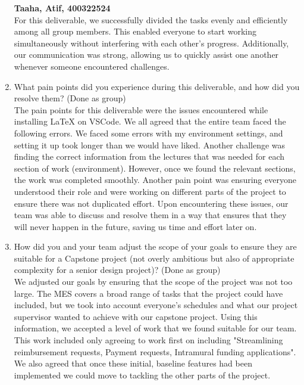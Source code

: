 \documentclass{article}
\begin{document}
\begin{enumerate}
    \textbf{Taaha, Atif, 400322524} \\
    For this deliverable, we successfully divided the tasks evenly and efficiently among all group members. This enabled everyone to start working simultaneously without interfering with each other's progress. Additionally, our communication was strong, allowing us to quickly assist one another whenever someone encountered challenges.
    \item What pain points did you experience during this deliverable, and how
    did you resolve them? (Done as group) \\
    The pain points for this deliverable were the issues encountered while installing LaTeX on VSCode. We all agreed that the entire team faced the following errors. We faced some errors with my environment settings, and setting it up took longer than we would have liked. Another challenge was finding the correct information from the lectures that was needed for each section of work (environment). However, once we found the relevant sections, the work was completed smoothly. Another pain point was ensuring everyone understood their role and were working on different parts of the project to ensure there was not duplicated effort. Upon encountering these issues, our team was able to discuss and resolve them in a way that ensures that they will never happen in the future, saving us time and effort later on.
    \item How did you and your team adjust the scope of your goals to ensure
    they are suitable for a Capstone project (not overly ambitious but also of
    appropriate complexity for a senior design project)? (Done as group)\\
    We adjusted our goals by ensuring that the scope of the project was not too large. The MES covers a broad range of tasks that the project could have included, but we took into account everyone’s schedules and what our project supervisor wanted to achieve with our capstone project. Using this information, we accepted a level of work that we found suitable for our team. This work included only agreeing to work first on including "Streamlining reimbursement requests, Payment requests, Intramural funding applications". We also agreed that once these initial, baseline features had been implemented we could move to tackling the other parts of the project.
\end{enumerate}  
\end{document}
